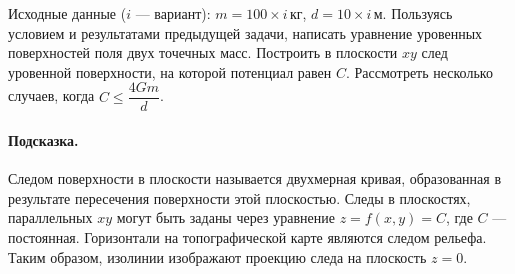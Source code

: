 \documentclass[11pt, a4paper,addpoints]{exam}
\theoremstyle{remark}
\renewcommand{\leq}{\ensuremath{\leqslant}}
\begin{document}
\begin{questions}
    Исходные данные ($i$ --- вариант): $m = 100\times i\,\text{кг}$, $d = 10\times i\,\text{м}$.
    \question[2] Пользуясь условием и результатами предыдущей задачи, написать уравнение уровенных
    поверхностей поля двух точечных масс. Построить в плоскости $xy$ след уровенной поверхности,
        на которой потенциал равен $C$. Рассмотреть несколько случаев, когда $C \leq \dfrac{4Gm}{d}$.
        \paragraph{Подсказка.} Следом поверхности в плоскости называется двухмерная кривая, образованная в
        результате
        пересечения поверхности этой плоскостью. Следы в плоскостях, параллельных $xy$ могут быть
        заданы через уравнение $z = f\left( x, y \right) = C$, где $C$ --- постоянная.
        Горизонтали на топографической карте являются следом рельефа.
        Таким образом, изолинии изображают проекцию следа на плоскость $z=0$.
\end{questions}
\end{document}
